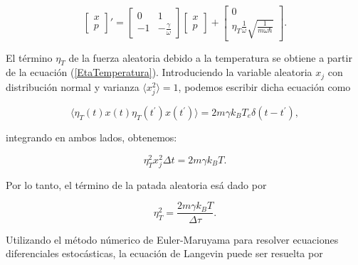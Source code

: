 \documentclass[letterpaper,12pt,oneside]{book}
\begin{document}
	\begin{equation}
		\begin{bmatrix}
		x \\ p
		\end{bmatrix}' = 
		\begin{bmatrix}
		0 & 1 \\
		-1 & -\frac{\gamma}{\omega}
		\end{bmatrix}
		\begin{bmatrix}
		x \\ p
		\end{bmatrix} 
		+
		\begin{bmatrix}
		0 \\ \eta_T\frac{1}{\omega}\sqrt{\frac{1}{m\omega\hbar}}
		\end{bmatrix}.
	\end{equation}
	
	
	
	 El t\'ermino $\eta_T$ de la fuerza aleatoria debido a la temperatura se obtiene a partir de la ecuaci\'on (\ref{EtaTemperatura}). Introduciendo la variable aleatoria $x_j$ con distribuci\'on normal y varianza $\langle x_j^2 \rangle = 1$, podemos escribir dicha ecuaci\'on como
	
	\begin{equation}
		\langle \eta_T(t)x(t)\eta_T(t^{'})x(t^{'}) \rangle = 2m\gamma k_BT_e\delta(t-t^{'
		}),
	\end{equation}
	
	\noindent integrando en ambos lados, obtenemos:
	
	\begin{equation}
		\eta_T^2x_j^2\Delta t = 2m\gamma k_B T.
	\end{equation}
	
	Por lo tanto, el t\'ermino de la patada aleatoria es\'a dado por
	
	\begin{equation}\label{EtaTemperaturaCalculado}
		\eta_T^2 = \frac{2m\gamma k_BT}{\Delta \tau}.
	\end{equation}
	
	Utilizando el m\'etodo n\'umerico de Euler-Maruyama para resolver ecuaciones diferenciales estoc\'asticas, la ecuaci\'on de Langevin puede ser resuelta por
	
\end{document}
